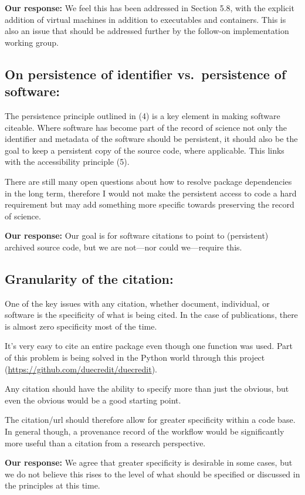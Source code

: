 \documentclass[12pt, oneside]{amsart}
\begin{document}
\textbf{Our response:} We feel this has been addressed in Section 5.8, with the explicit addition of virtual machines in addition to executables and containers. This is also an issue that should be addressed further by the follow-on implementation working group.

\subsection{On persistence of identifier vs.\ persistence of software:} The persistence principle outlined in (4) is a key element in making software citeable. Where software has become part of the record of science not only the identifier and metadata of the software should be persistent, it should also be the goal to keep a persistent copy of the source code, where applicable. This links with the accessibility principle (5).

There are still many open questions about how to resolve package dependencies in the long term, therefore I would not make the persistent access to code a hard requirement but may add something more specific towards preserving the record of science.

\textbf{Our response:} Our goal is for software citations to point to (persistent) archived source code, but we are not---nor could we---require this.

\subsection{Granularity of the citation:} One of the key issues with any citation, whether document, individual, or software is the specificity of what is being cited. In the case of publications, there is almost zero specificity most of the time.

It's very easy to cite an entire package even though one function was used. Part of this problem is being solved in the Python world through this project (\url{https://github.com/duecredit/duecredit}).

Any citation should have the ability to specify more than just the obvious, but even the obvious would be a good starting point.

The citation\slash url should therefore allow for greater specificity within a code base. In general though, a provenance record of the workflow would be significantly more useful than a citation from a research perspective.

\textbf{Our response:} We agree that greater specificity is desirable in some cases, but we do not believe this rises to the level of what should be specified or discussed in the principles at this time.
\end{document}
